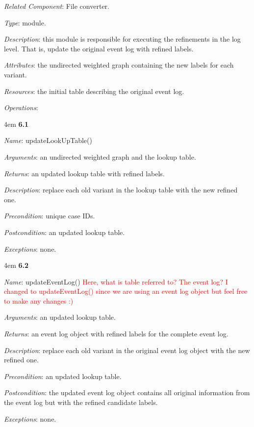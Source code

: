 \documentclass[notitlepage]{article}
\begin{document}
\begin{flushleft}
\textit{Related Component}: File converter.

\textit{Type}: module.

\textit{Description}: this module is responsible for executing the refinements in the log level. That is, update the original event log with refined labels.

\textit{Attributes}: the undirected weighted graph containing the new labels for each variant.

\textit{Resources}: the initial table describing the original event log.

\textit{Operations}: 
\medskip

\par
\begingroup
\leftskip4em
\textbf{6.1} 

\textit{Name}: updateLookUpTable()

\textit{Arguments}: an undirected weighted graph and the lookup table.

\textit{Returns}: an updated lookup table with refined labels.

\textit{Description}: replace each old variant in the lookup table with the new refined one.

\textit{Precondition}: unique case IDs.

\textit{Postcondition}: an updated lookup table.

\textit{Exceptions}: none.
\par
\endgroup


\medskip

\par
\begingroup
\leftskip4em
\textbf{6.2} 

\textit{Name}: updateEventLog() \textcolor{red}{Here, what is table referred to? The event log? I changed to updateEventLog() since we are using an event log object but feel free to make any changes :)}

\textit{Arguments}: an updated lookup table.

\textit{Returns}: an event log object with refined labels for the complete event log.

\textit{Description}: replace each old variant in the original event log object with the new refined one.

\textit{Precondition}: an updated lookup table.

\textit{Postcondition}: the updated event log object contains all original information from the event log but with the refined candidate labels.

\textit{Exceptions}: none.
\par
\endgroup





\end{flushleft}
\end{document}
